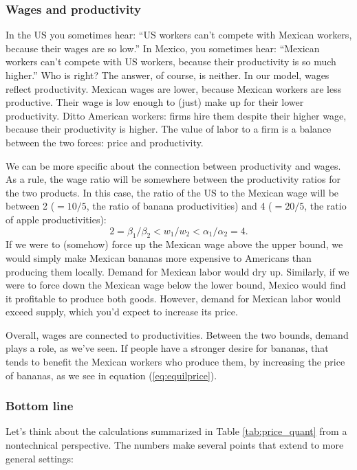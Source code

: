 \documentclass[letterpaper,12pt]{article}
\begin{document}
\subsubsection*{Wages and productivity}

In the US you sometimes hear:  ``US workers can't compete
with Mexican workers, because their wages are so low.''
In Mexico, you sometimes hear:
``Mexican workers can't compete with US workers,
because their productivity is so much higher.''
Who is right?
The answer, of course, is neither.
In our model, wages reflect productivity.
Mexican wages are lower, because Mexican workers are less productive.
Their wage is low enough to (just) make up for their lower productivity.
Ditto American workers:  firms hire them despite their higher wage,
because their productivity is higher.
The value of labor to a firm is a balance between the two forces:
price and productivity.

We can be more specific about the connection between productivity
and wages.
As a rule, the wage ratio will be somewhere between
the productivity ratios for the two products.
In this case,
the ratio of the US to the Mexican wage will be between
2 ($=10/5$, the ratio of banana productivities)
and 4 ($=20/5$, the ratio of apple productivities):
\[
  2 = \beta_1/\beta_2   < w_1/w_2  < \alpha_1/\alpha_2 = 4.
\]
If we were to (somehow) force up the Mexican wage
above the upper bound, we would simply make Mexican bananas
more expensive to Americans than producing them locally.
Demand for Mexican labor would dry up.
Similarly, if we were to force down the Mexican wage below
the lower bound, Mexico would find it profitable to produce
both goods.
However, demand for Mexican labor would exceed supply,
which you'd expect to increase its price.

Overall, wages are connected to productivities.
Between the two bounds, demand plays a role, as we've seen.
If people have a stronger desire for bananas, that tends
to benefit the Mexican workers who produce them,
by increasing the price of bananas,
as we see in equation  (\ref{eq:equilprice}).


\subsubsection*{Bottom line}

Let's think about the calculations summarized in
Table \ref{tab:price_quant} from a nontechnical perspective.
The numbers make several points that
extend to more general settings:
\end{document}
